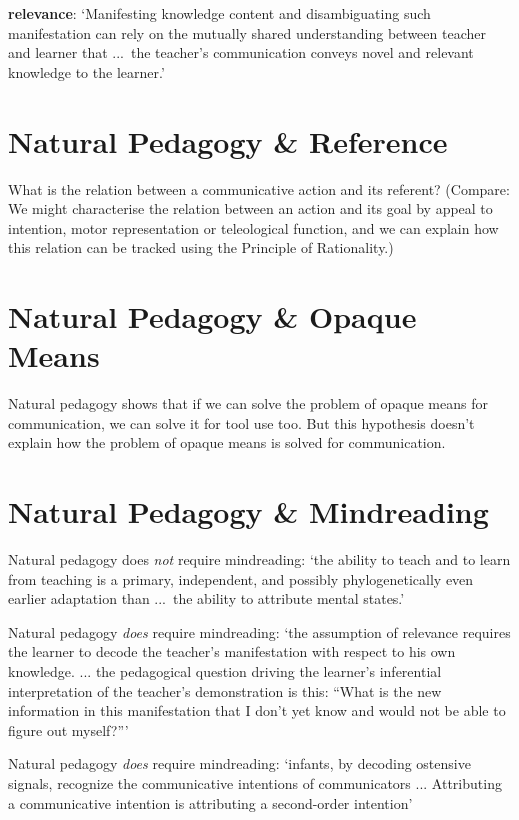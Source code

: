 \documentclass[11pt]{extarticle}
\begin{document}
\begin{multicols}{3}
\textbf{relevance}:  ‘Manifesting knowledge content and disambiguating such manifestation can rely on the mutually shared understanding between teacher and learner that ...\ the teacher's communication conveys novel and relevant knowledge to the learner.’ \citep{Csibra:2005zr} %


\section{Natural Pedagogy \& Reference}
What is the relation between a communicative action and its referent?
(Compare: We might characterise the relation between an action and its goal by appeal to intention, motor representation or teleological function, and we can explain how this relation can be tracked using the Principle of Rationality.)



\section{Natural Pedagogy \& Opaque Means}
Natural pedagogy shows that if we can solve the problem of opaque means for communication, we can solve it for tool use too.
But this hypothesis doesn't explain how the problem of opaque means is solved for communication.



\section{Natural Pedagogy \& Mindreading}
Natural pedagogy does \emph{not} require mindreading:
‘the ability to teach and to learn from teaching is a primary, independent, and possibly phylogenetically even earlier adaptation than ...\ the ability to attribute mental states.'\citep{Gergely:2012np} %

Natural pedagogy \emph{does} require mindreading:
`the assumption of relevance requires the learner to decode the teacher's manifestation with respect to his own knowledge.  ...  the pedagogical question driving the learner's inferential interpretation of the teacher’s demonstration is this: ``What is the new information in this manifestation that I don’t yet know and would not be able to figure out myself?'''\citep{Csibra:2005zr} %

Natural pedagogy \emph{does} require mindreading:
`infants, by decoding ostensive signals, recognize the communicative intentions of communicators ... Attributing a communicative intention is attributing a second-order intention'\citep{csibra:2010_recognizing} %






\footnotesize 


\end{multicols}
\end{document}

